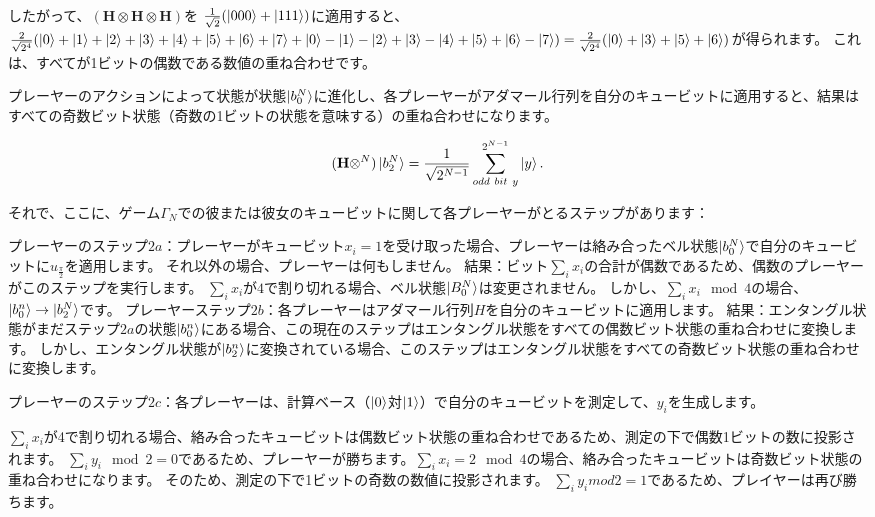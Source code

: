 
したがって、$( \mathbf{H} \otimes \mathbf{H} \otimes \mathbf{H})$を $\frac{1}{\sqrt{2}}(\ket{000} + \ket{111}) $に適用すると、$\frac{2}{\sqrt{2^4}}(\ket{0}+\ket{1}+\ket{2}+\ket{3}+\ket{4}+\ket{5}+\ket{6}+\ket{7} + \ket{0}-\ket{1}-\ket{2}+\ket{3}-\ket{4}+\ket{5}+\ket{6}-\ket{7} ) = \frac{2}{\sqrt{2^4}}(\ket{0}+\ket{3}+\ket{5}+\ket{6})$が得られます。
これは、すべてが1ビットの偶数である数値の重ね合わせです。

プレーヤーのアクションによって状態が状態$\ket{b_0^N}$に進化し、各プレーヤーがアダマール行列を自分のキュービットに適用すると、結果はすべての奇数ビット状態（奇数の1ビットの状態を意味する）の重ね合わせになります。

\begin{equation}
\label{204}
(\mathbf{H} \otimes ^N)
\ket{b_2^N}
=
\frac{1}{\sqrt{2^{N-1}}}  \sum_{odd \ bit \ y}^{2^{N-1}} \ket{y} .
\end{equation}

それで、ここに、ゲーム$\Gamma_N$での彼または彼女のキュービットに関して各プレーヤーがとるステップがあります：

プレーヤーのステップ$2a$：プレーヤーがキュービット$x_i = 1$を受け取った場合、プレーヤーは絡み合ったベル状態$\ket{b_0^N}$で自分のキュービットに$ u_{\frac{\pi}{2}}$を適用します。
それ以外の場合、プレーヤーは何もしません。 結果：ビット$ \sum_i x_i$の合計が偶数であるため、偶数のプレーヤーがこのステップを実行します。
$\sum_i x_i$が$4$で割り切れる場合、ベル状態$\ket{B_0^N}$は変更されません。
しかし、$ \sum_i x_i \mod 4$の場合、$ \ket{b_0^n} \to \ket{b_2^N}$です。
プレーヤーステップ$2b$：各プレーヤーはアダマール行列$H$を自分のキュービットに適用します。
結果：エンタングル状態がまだステップ$2a$の状態$\ket{b_0^n}$にある場合、この現在のステップはエンタングル状態をすべての偶数ビット状態の重ね合わせに変換します。
しかし、エンタングル状態が$\ket{b_2^n}$に変換されている場合、このステップはエンタングル状態をすべての奇数ビット状態の重ね合わせに変換します。

プレーヤーのステップ$2c$：各プレーヤーは、計算ベース（$\ket{0}$対$\ket{1}$）で自分のキュービットを測定して、$y_i$を生成します。


$\sum_i x_i$が4で割り切れる場合、絡み合ったキュービットは偶数ビット状態の重ね合わせであるため、測定の下で偶数1ビットの数に投影されます。
$\sum_i y_i \mod 2 = 0 $であるため、プレーヤーが勝ちます。$ \sum_i x_i =2 \mod 4$の場合、絡み合ったキュービットは奇数ビット状態の重ね合わせになります。
そのため、測定の下で1ビットの奇数の数値に投影されます。 
$\sum_i y_i mod 2 = 1$であるため、プレイヤーは再び勝ちます。

